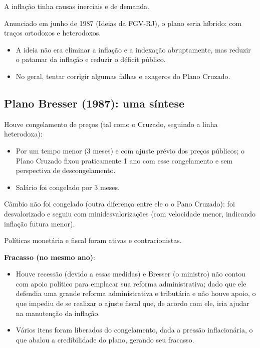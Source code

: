 \documentclass[a4paper,12pt]{article}[abntex2]
\begin{document}
A inflação tinha causas inerciais e de demanda.

Anunciado em junho de 1987 (Ideias da FGV-RJ), o plano seria híbrido: com traços ortodoxos e heterodoxos.\begin{itemize}
    \item A ideia não era eliminar a inflação e a indexação abruptamente, mas reduzir o patamar da inflação e reduzir o déficit público.
    \item No geral, tentar corrigir algumas falhas e exageros do Plano Cruzado.
\end{itemize}

\subsection{\textbf{Plano Bresser (1987): uma síntese}}

Houve congelamento de preços (tal como o Cruzado, seguindo a linha heterodoxa):
\begin{itemize}
    \item Por um tempo menor (3 meses) e com ajuste prévio dos preços públicos; o Plano Cruzado fixou praticamente 1 ano com esse congelamento e sem perspectiva de descongelamento.
    \item Salário foi congelado por 3 meses.
\end{itemize}

Câmbio não foi congelado (outra diferença entre ele o o Pano Cruzado): foi desvalorizado e seguiu com minidesvalorizações (com velocidade menor, indicando inflação futura menor).

Políticas monetária e fiscal foram ativas e contracionistas.

\textbf{Fracasso (no mesmo ano)}:\begin{itemize}
    \item Houve recessão (devido a essas medidas) e Bresser (o ministro) não contou com apoio político para emplacar sua reforma administrativa; dado que ele defendia uma grande reforma administrativa e tributária e não houve apoio, o que impediu de se realizar o ajuste fiscal que, de acordo com ele, iria ajudar na manutenção da inflação.
    \item Vários itens foram liberados do congelamento, dada a pressão inflacionária, o que abalou a credibilidade do plano, gerando seu fracasso.
\end{itemize}
\end{document}
